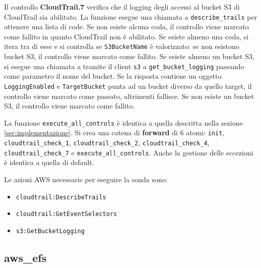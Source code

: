 Il controllo \textbf{CloudTrail.7} verifica che il logging degli accessi al bucket S3 di CloudTrail sia abilitato. La funzione esegue una chiamata a \texttt{describe\_trails} per ottenere una lista di code. Se non esiste alcuna coda, il controllo viene marcato come fallito in quanto CloudTrail non è abilitato. Se esiste almeno una coda, si itera tra di esse e si controlla se \texttt{S3BucketName} è valorizzato: se non esistono bucket S3, il controllo viene marcato come fallito. Se esiste almeno un bucket S3, si esegue una chiamata a tramite il client \texttt{s3} a \texttt{get\_bucket\_logging} passando come parametro il nome del bucket. Se la risposta contiene un oggetto \texttt{LoggingEnabled} e \texttt{TargetBucket} punta ad un bucket diverso da quello target, il controllo viene marcato come passato, altrimenti fallisce. Se non esiste un bucket S3, il controllo viene marcato come fallito.

La funzione \texttt{execute\_all\_controls} è identica a quella descritta nella sezione \ref{sec:implementazione}. Si crea una catena di \textbf{forward} di 6 atomi: \texttt{init}, \texttt{cloudtrail\_check\_1}, \texttt{cloudtrail\_check\_2}, \texttt{cloudtrail\_check\_4}, \texttt{cloudtrail\_check\_7} e \texttt{execute\_all\_controls}. Anche la gestione delle eccezioni è identica a quella di default.

Le azioni AWS necessarie per eseguire la sonda sono:
\begin{itemize}
    \item \texttt{cloudtrail:DescribeTrails}
    \item \texttt{cloudtrail:GetEventSelectors}
    \item \texttt{s3:GetBucketLogging}
\end{itemize}

\subsection{aws\_efs}
\label{sec:efs}

